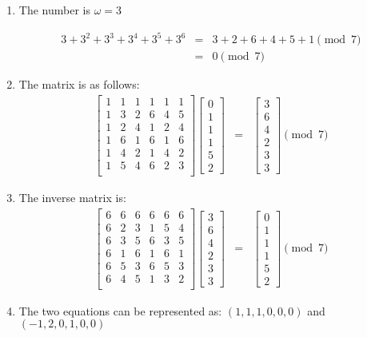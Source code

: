 \documentclass[11pt]{article}
\begin{document}
\begin{enumerate}
\item The number is $\omega = 3$

\begin{eqnarray*}
3 + 3^2 + 3^3 + 3^4 + 3^5 + 3^6 &=& 3 + 2 + 6 + 4 + 5 + 1 \pmod{7}\\
&=& 0 \pmod{7}
\end{eqnarray*}

\item The matrix is as follows:
\begin{eqnarray*}
\begin{bmatrix}
1&1&1&1&1&1\\
1&3&2&6&4&5\\
1&2&4&1&2&4\\
1&6&1&6&1&6\\
1&4&2&1&4&2\\
1&5&4&6&2&3\\
\end{bmatrix}
\begin{bmatrix}
0\\
1\\
1\\
1\\
5\\
2
\end{bmatrix} &=& 
\begin{bmatrix}
3\\
6\\
4\\
2\\
3\\
3
\end{bmatrix}
\pmod{7}
\end{eqnarray*}
\item The inverse matrix is:
\begin{eqnarray*}
\begin{bmatrix}
6&6&6&6&6&6\\
6&2&3&1&5&4\\
6&3&5&6&3&5\\
6&1&6&1&6&1\\
6&5&3&6&5&3\\
6&4&5&1&3&2\\
\end{bmatrix}
\begin{bmatrix}
3\\
6\\
4\\
2\\
3\\
3
\end{bmatrix}
&=& 
\begin{bmatrix}
0\\
1\\
1\\
1\\
5\\
2
\end{bmatrix}
\pmod{7}
\end{eqnarray*}
\item
The two equations can be represented as: $(1, 1, 1, 0, 0, 0)$ and $(-1, 2, 0,
1, 0, 0)$


\end{enumerate}
\end{document}
